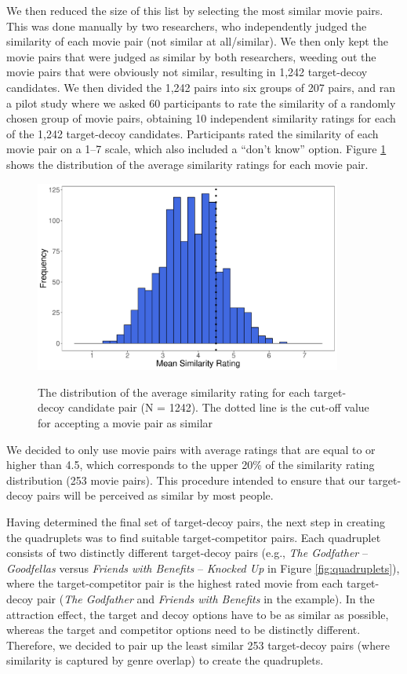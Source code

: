 \documentclass[12pt, a4paper]{article}
\begin{document}
We then reduced the size of this list by selecting the most similar movie pairs. This was done manually by two researchers, who independently judged the similarity of each movie pair (not similar at all/similar). We then only kept the movie pairs that were judged as similar by both researchers, weeding out the movie pairs that were obviously not similar, resulting in 1,242 target-decoy candidates. We then divided the 1,242 pairs into six groups of 207 pairs, and ran a pilot study where we asked 60 participants to rate the similarity of a randomly chosen group of movie pairs, obtaining 10 independent similarity ratings for each of the 1,242 target-decoy candidates. Participants rated the similarity of each movie pair on a 1--7 scale, which also included a ``don't know'' option. Figure \ref{fig:exp2_pilot}  shows the distribution of the average similarity ratings for each movie pair.

\begin{figure}[htb!]
\centering
		\caption{The distribution of the average similarity rating for each target-decoy candidate pair (N = 1242). The dotted line is the cut-off value for accepting a movie pair as similar}
\includegraphics[width=0.9\textwidth]{figure2.pdf}
\label{fig:exp2_pilot}
\end{figure}

We decided to only use movie pairs with average ratings that are equal to or higher than 4.5, which corresponds to the upper 20\% of the similarity rating distribution (253 movie pairs). This procedure intended to ensure that our target-decoy pairs will be perceived as similar by most people.

Having determined the final set of target-decoy pairs, the next step in creating the quadruplets was to find suitable target-competitor pairs. Each quadruplet consists of two distinctly different target-decoy pairs (e.g., \textit{The Godfather} -- \textit{Goodfellas} versus \textit{Friends with Benefits} -- \textit{Knocked Up} in Figure \ref{fig:quadruplets}), where the target-competitor pair is the highest rated movie from each target-decoy pair (\textit{The Godfather} and \textit{Friends with Benefits} in the example). In the attraction effect, the target and decoy options have to be as similar as possible, whereas the target and competitor options need to be distinctly different. Therefore, we decided to pair up the least similar 253 target-decoy pairs (where similarity is captured by genre overlap) to create the quadruplets. 
\end{document}
